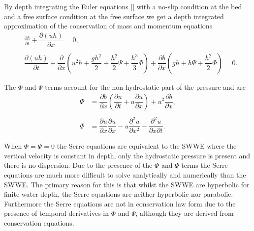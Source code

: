 By depth integrating the Euler equations [] with a no-slip condition at the bed and a free surface condition at the free surface we get a depth integrated approximation of the conservation of mass and momentum equations
\begin{subequations}
	\begin{align}
	&\frac{\partial h}{\partial t} + \dfrac{\partial (uh)}{\partial x} = 0,  \label{eqn:FullSerreNonConMass} \\ \nonumber \\
	&\dfrac{\partial (uh)}{\partial t} + \dfrac{\partial}{\partial x} \left ( u^2h + \dfrac{gh^2}{2} + \dfrac{h^2}{2}{\Psi} + \dfrac{h^3}{3}{ \Phi }  \right )  +  \dfrac{\partial b}{\partial x} \left (gh +   h \Psi + \dfrac{h^2}{2}{ \Phi }  \right ) = 0.	\label{eqn:FullSerreNonConMome}
	\end{align}
	\label{eqn:FullSerreNonCon}
\end{subequations}
\begin{defn}
	\label{eqn:FullSerreNonConVarDef}
	The $\Phi$ and $\Psi$ terms account for the non-hydrostatic part of the pressure and are
	\begin{subequations}
	\begin{align}
	{ \Psi }  &= \dfrac{\partial b}{\partial x}\left(\dfrac{\partial u}{\partial t} + u\dfrac{\partial u}{\partial x} \right)  + u^2\dfrac{\partial b}{\partial x}, \label{eqn:SerreeqnPsi} \\ \nonumber \\
 { \Phi }  &= \dfrac{\partial u }{\partial x} \dfrac{\partial u}{\partial x} -u \dfrac{\partial^2 u}{\partial x^2}  - \dfrac{\partial^2 u}{\partial x \partial t} . \label{eqn:SerreeqnPhi} 
	\end{align}
	\end{subequations}
\end{defn}
When $\Phi = \Psi = 0$ the Serre equations are equivalent to the SWWE where the vertical velocity is constant in depth, only the hydrostatic pressure is present and there is no dispersion. Due to the presence of the $\Phi$ and $\Psi$ terms the Serre equations are much more difficult to solve analytically and numerically than the SWWE. The primary reason for this is that whilst the SWWE are hyperbolic for finite water depth, the Serre equations are neither hyperbolic nor parabolic. Furthermore the Serre equations are not in conservation law form due to the presence of temporal derivatives in $\Phi$ and $\Psi$, although they are derived from conservation equations. 

